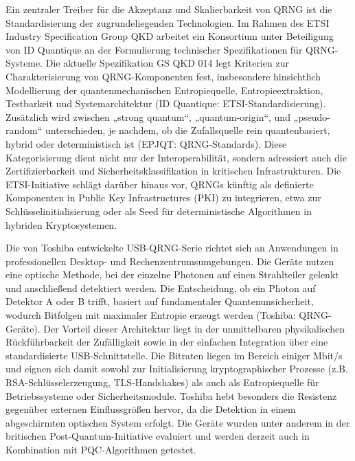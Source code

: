 Ein zentraler Treiber für die Akzeptanz und Skalierbarkeit von QRNG ist die Standardisierung der zugrundeliegenden Technologien. Im Rahmen des ETSI Industry Specification Group QKD arbeitet ein Konsortium unter Beteiligung von ID Quantique an der Formulierung technischer Spezifikationen für QRNG-Systeme. Die aktuelle Spezifikation GS QKD 014 legt Kriterien zur Charakterisierung von QRNG-Komponenten fest, insbesondere hinsichtlich Modellierung der quantenmechanischen Entropiequelle, Entropieextraktion, Testbarkeit und Systemarchitektur (ID Quantique: ETSI-Standardisierung). Zusätzlich wird zwischen „strong quantum“, „quantum-origin“, und „pseudo-random“ unterschieden, je nachdem, ob die Zufallsquelle rein quantenbasiert, hybrid oder deterministisch ist (EPJQT: QRNG-Standards). Diese Kategorisierung dient nicht nur der Interoperabilität, sondern adressiert auch die Zertifizierbarkeit und Sicherheitsklassifikation in kritischen Infrastrukturen. Die ETSI-Initiative schlägt darüber hinaus vor, QRNGs künftig als definierte Komponenten in Public Key Infrastructures (PKI) zu integrieren, etwa zur Schlüsselinitialisierung oder als Seed für deterministische Algorithmen in hybriden Kryptosystemen.

Die von Toshiba entwickelte USB-QRNG-Serie richtet sich an Anwendungen in professionellen Desktop- und Rechenzentrumsumgebungen. Die Geräte nutzen eine optische Methode, bei der einzelne Photonen auf einen Strahlteiler gelenkt und anschließend detektiert werden. Die Entscheidung, ob ein Photon auf Detektor A oder B trifft, basiert auf fundamentaler Quantenunsicherheit, wodurch Bitfolgen mit maximaler Entropie erzeugt werden (Toshiba: QRNG-Geräte). Der Vorteil dieser Architektur liegt in der unmittelbaren physikalischen Rückführbarkeit der Zufälligkeit sowie in der einfachen Integration über eine standardisierte USB-Schnittstelle. Die Bitraten liegen im Bereich einiger Mbit/s und eignen sich damit sowohl zur Initialisierung kryptographischer Prozesse (z.B. RSA-Schlüsselerzeugung, TLS-Handshakes) als auch als Entropiequelle für Betriebssysteme oder Sicherheitsmodule. Toshiba hebt besonders die Resistenz gegenüber externen Einflussgrößen hervor, da die Detektion in einem abgeschirmten optischen System erfolgt. Die Geräte wurden unter anderem in der britischen Post-Quantum-Initiative evaluiert und werden derzeit auch in Kombination mit PQC-Algorithmen getestet.

